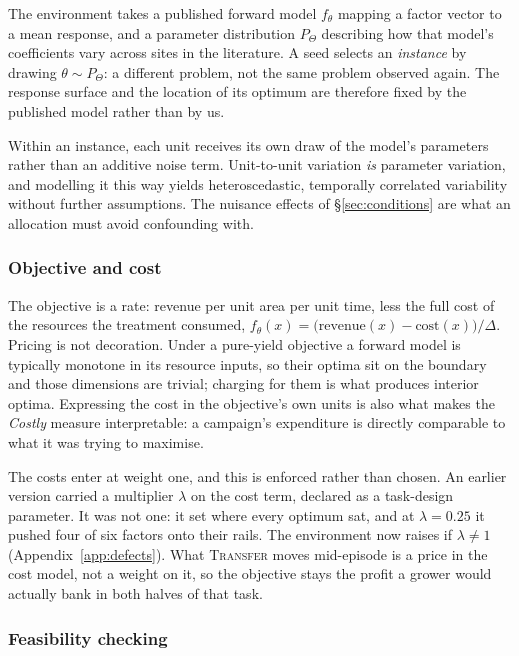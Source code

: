 The environment takes a published forward model $f_\theta$ mapping a factor vector to a mean
response, and a parameter distribution $P_\Theta$ describing how that model's coefficients
vary across sites in the literature. A seed selects an \emph{instance} by drawing
$\theta \sim P_\Theta$: a different problem, not the same problem observed again. The
response surface and the location of its optimum are therefore fixed by the published model
rather than by us.

Within an instance, each unit receives its own draw of the model's parameters rather than an
additive noise term. Unit-to-unit variation \emph{is} parameter variation, and modelling it
this way yields heteroscedastic, temporally correlated variability without further
assumptions. The nuisance effects of \S\ref{sec:conditions} are what an allocation must avoid
confounding with.

\subsubsection{Objective and cost}
\label{sec:costmodel}

The objective is a rate: revenue per unit area per unit time, less the full cost of the
resources the treatment consumed, $f_\theta(x) = \big(\text{revenue}(x) -
\text{cost}(x)\big) / \Delta$. Pricing is not decoration. Under a pure-yield objective a
forward model is typically monotone in its resource inputs, so their optima sit on the
boundary and those dimensions are trivial; charging for them is what produces interior
optima. Expressing the cost in the objective's own units is also what makes the
\emph{Costly} measure interpretable: a campaign's expenditure is directly comparable to
what it was trying to maximise.

The costs enter at weight one, and this is enforced rather than chosen. An earlier version
carried a multiplier $\lambda$ on the cost term, declared as a task-design parameter. It
was not one: it set where every optimum sat, and at $\lambda = 0.25$ it pushed four of six
factors onto their rails. The environment now raises if $\lambda \neq 1$
(Appendix~\ref{app:defects}). What \textsc{Transfer} moves mid-episode is a price in the
cost model, not a weight on it, so the objective stays the profit a grower would actually
bank in both halves of that task.

\subsubsection{Feasibility checking}
\label{sec:checking}

